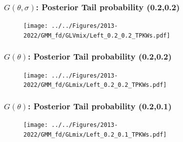 \documentclass[10pt,mathserif,aspectratio=169]{beamer}
\begin{document}
\begin{frame}
  \frametitle{$G(\theta,\sigma)$: Posterior Tail probability (0.2,0.2)}
  \begin{figure}
    \centering
    \texttt{[image: ../../Figures/2013-2022/GMM\_fd/GLVmix/Left\_0.2\_0.2\_TPKWs.pdf]}
  \end{figure}
\end{frame}




\begin{frame}
  \frametitle{$G(\theta)$: Posterior Tail probability (0.2,0.2)}
  \begin{figure}
    \centering
    \texttt{[image: ../../Figures/2013-2022/GMM\_fd/GLmix/Left\_0.2\_0.2\_TPKWs.pdf]}
  \end{figure}
\end{frame}

\begin{frame}[label=tpselect]
  \frametitle{$G(\theta)$: Posterior Tail probability (0.2,0.1)}
  \begin{figure}
    \centering
    \texttt{[image: ../../Figures/2013-2022/GMM\_fd/GLmix/Left\_0.2\_0.1\_TPKWs.pdf]}
  \end{figure}
  \hyperlink{tpcontour}{}
\end{frame}
\end{document}
